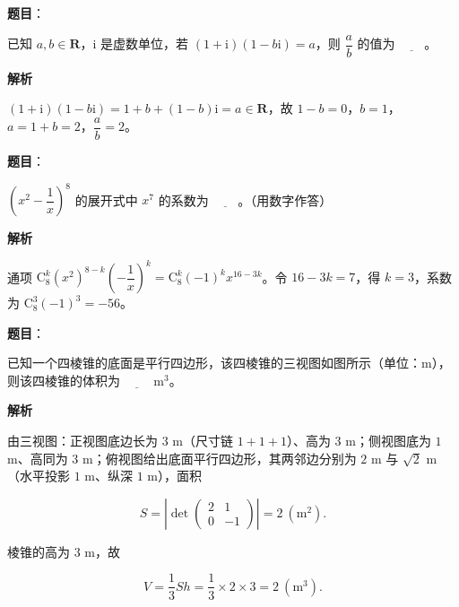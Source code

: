 \begin{answer}

\textbf{题目}：

已知 \(a,b\in\mathbf{R}\)，\(\mathrm{i}\) 是虚数单位，若 \((1+\mathrm{i})(1-b\mathrm{i})=a\)，则 \(\dfrac{a}{b}\) 的值为 \(\underline{\qquad}\)。

\textbf{解析}

\((1+\mathrm{i})(1-b\mathrm{i})=1+b+(1-b)\mathrm{i}=a\in\mathbf{R}\)，故 \(1-b=0\)，\(b=1\)，\(a=1+b=2\)，\(\dfrac{a}{b}=2\)。


\end{answer}
\begin{answer}

\textbf{题目}：

\(\left(x^{2}-\dfrac{1}{x}\right)^{8}\) 的展开式中 \(x^{7}\) 的系数为 \(\underline{\qquad}\)。（用数字作答）

\textbf{解析}

通项 \(\mathrm C_{8}^{k}(x^{2})^{8-k}\left(-\dfrac{1}{x}\right)^{k}=\mathrm C_{8}^{k}(-1)^{k}x^{16-3k}\)。令 \(16-3k=7\)，得 \(k=3\)，系数为 \(\mathrm C_{8}^{3}(-1)^{3}=-56\)。


\end{answer}
\begin{answer}

\textbf{题目}：

已知一个四棱锥的底面是平行四边形，该四棱锥的三视图如图所示（单位：m），则该四棱锥的体积为 \(\underline{\qquad}\) \(\mathrm{m}^{3}\)。
\nopagebreak[4]
\begin{center}\end{center}
\nopagebreak[4]
\textbf{解析}

由三视图：正视图底边长为 \(3\) m（尺寸链 \(1+1+1\)）、高为 \(3\) m；侧视图底为 \(1\) m、高同为 \(3\) m；俯视图给出底面平行四边形，其两邻边分别为 \(2\) m 与 \(\sqrt{2}\) m（水平投影 \(1\) m、纵深 \(1\) m），面积

\nopagebreak[4]
\[
S=\left|\det\begin{pmatrix}2&1\\0&-1\end{pmatrix}\right|=2\ (\mathrm{m}^{2}).
\]

棱锥的高为 \(3\) m，故

\nopagebreak[4]
\[
V=\frac{1}{3}Sh=\frac{1}{3}\times2\times3=2\ (\mathrm{m}^{3}).
\]


\end{answer}
